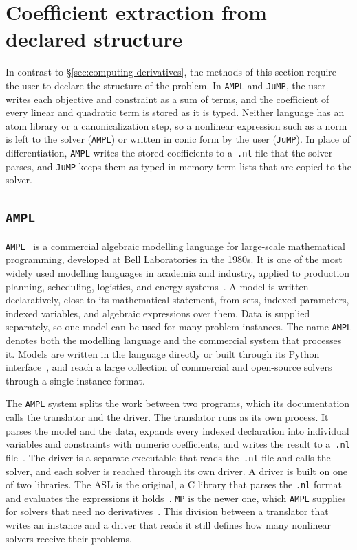 \section{Coefficient extraction from declared structure}
\label{sec:declared-structure}

In contrast to \S\ref{sec:computing-derivatives}, the methods of this section require the user
to declare the structure of the problem. In \texttt{AMPL} and \texttt{JuMP}, the user writes
each objective and constraint as a sum of terms, and the coefficient of every linear and
quadratic term is stored as it is typed. Neither language has an atom library or a
canonicalization step, so a nonlinear expression such as a norm is left to the solver
(\texttt{AMPL}) or written in conic form by the user (\texttt{JuMP}). In place of
differentiation, \texttt{AMPL} writes the stored coefficients to a~\texttt{.nl} file that the
solver parses, and \texttt{JuMP} keeps them as typed in-memory term lists that are copied to
the solver.

\subsection{\texttt{AMPL}}
\label{sec:ampl}

\texttt{AMPL}~\cite{fourer1990ampl} is a commercial algebraic modelling language for
large-scale mathematical programming, developed at Bell Laboratories in the 1980s. It is one
of the most widely used modelling languages in academia and industry, applied to production
planning, scheduling, logistics, and energy systems~\cite{fourer2003ampl}.
A model is written declaratively, close
to its mathematical statement, from sets, indexed parameters, indexed variables, and algebraic
expressions over them. Data is supplied separately, so one model can be used for
many problem instances.
The name \texttt{AMPL} denotes both the modelling language and the commercial system that
processes it. Models are written in the language directly or built through its Python
interface~\cite{amplpy}, and reach a large collection of commercial and open-source solvers
through a single instance format.

The \texttt{AMPL} system splits the work between two programs, which its documentation calls
the translator and the driver. The translator runs as its own process. It parses the model and
the data, expands every indexed declaration into individual variables and constraints with
numeric coefficients, and writes the result to a~\texttt{.nl} file~\cite{gay2005writing}.
The driver is a separate executable that reads the~\texttt{.nl} file
and calls the solver, and each solver is reached through its own driver.
A driver is built on one of two libraries. The \ac{ASL} is the original, a C library that
parses the \texttt{.nl} format and evaluates the expressions it holds~\cite{gay1997hooking}.
\texttt{MP} is the newer
one, which \texttt{AMPL} supplies for solvers that need no derivatives~\cite{mpdocs}. This division
between a translator that writes an instance and a driver that reads it still defines how many
nonlinear solvers receive their problems.

